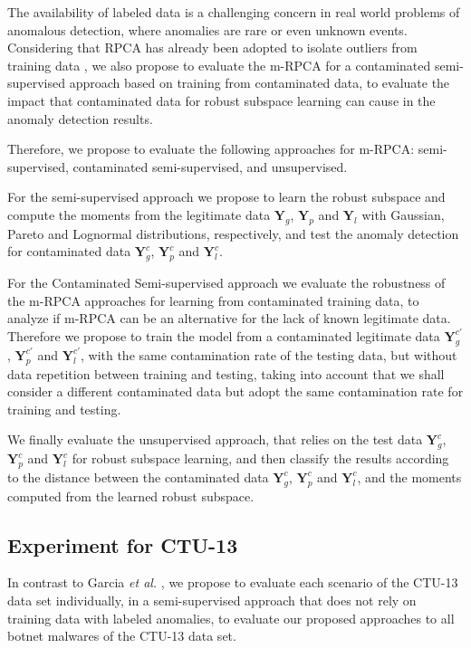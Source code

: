 \documentclass[review]{elsarticle}
\begin{document}
The availability of labeled data is a challenging concern in real world problems of anomalous detection, where anomalies are rare or even unknown events. Considering that RPCA has already been adopted to isolate outliers from training data \cite{zhou2017anomaly}, we also propose to evaluate the m-RPCA for a contaminated semi-supervised approach based on training from contaminated data, to evaluate the impact that contaminated data for robust subspace learning can cause in the anomaly detection results.

Therefore, we propose to evaluate the following approaches for m-RPCA: semi-supervised, contaminated semi-supervised, and unsupervised.

For the semi-supervised approach we propose to learn the robust subspace and compute the moments from the legitimate data $\pmb{Y}_g$, $\pmb{Y}_p$ and $\pmb{Y}_l$ with Gaussian, Pareto and Lognormal distributions, respectively, and test the anomaly detection for contaminated data $\pmb{Y}_g^c$, $\pmb{Y}_p^c$ and $\pmb{Y}_l^c$.

For the Contaminated Semi-supervised approach we evaluate the robustness of the m-RPCA approaches for learning from contaminated training data, to analyze if m-RPCA can be an alternative for the lack of known legitimate data. Therefore we propose to train the model from a contaminated legitimate data $\pmb{Y}_g^{c'}$, $\pmb{Y}_p^{c'}$ and $\pmb{Y}_l^{c'}$, with the same contamination rate of the testing data, but without data repetition between training and testing, taking into account that we shall consider a different contaminated data but adopt the same contamination rate for training and testing.

We finally evaluate the unsupervised approach, that relies on the test data $\pmb{Y}_g^c$, $\pmb{Y}_p^c$ and $\pmb{Y}_l^c$ for robust subspace learning, and then classify the results according to the distance between the contaminated data $\pmb{Y}_g^c$, $\pmb{Y}_p^c$ and $\pmb{Y}_l^c$, and the moments computed from the learned robust subspace.

\subsection{Experiment for CTU-13}
\label{sec:3_CTU13Scenario}

In contrast to Garcia \emph{et al.} \cite{garcia2014empirical}, we propose to evaluate each scenario of the CTU-13 data set individually, in a semi-supervised approach that does not rely on training data with labeled anomalies, to evaluate our proposed approaches to all botnet malwares of the CTU-13 data set. 
\end{document}

